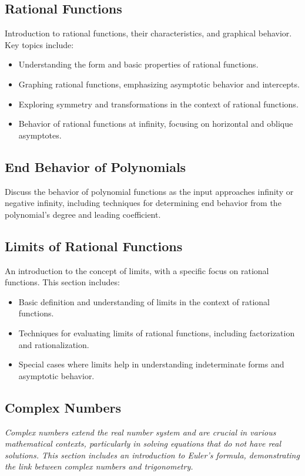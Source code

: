 \documentclass[a4paper,12pt]{book}
\begin{document}
\subsection{Rational Functions}
\label{subsec:rational_functions}
Introduction to rational functions, their characteristics, and graphical behavior. Key topics include:


\begin{itemize}
    \item Understanding the form and basic properties of rational functions.
    \item Graphing rational functions, emphasizing asymptotic behavior and intercepts.
    \item Exploring symmetry and transformations in the context of rational functions.
    \item Behavior of rational functions at infinity, focusing on horizontal and oblique asymptotes.
\end{itemize}


\subsection{End Behavior of Polynomials}
\label{subsec:end_behavior_polynomials}
Discuss the behavior of polynomial functions as the input approaches infinity or negative infinity, including techniques for determining end behavior from the polynomial's degree and leading coefficient.


\subsection{Limits of Rational Functions}
\label{subsec:limits_rational_functions}
An introduction to the concept of limits, with a specific focus on rational functions. This section includes:


\begin{itemize}
    \item Basic definition and understanding of limits in the context of rational functions.
    \item Techniques for evaluating limits of rational functions, including factorization and rationalization.
    \item Special cases where limits help in understanding indeterminate forms and asymptotic behavior.
\end{itemize}


\subsection{Complex Numbers}
\label{subsec:complex_numbers}
\textit{Complex numbers extend the real number system and are crucial in various mathematical contexts, particularly in solving equations that do not have real solutions. This section includes an introduction to Euler's formula, demonstrating the link between complex numbers and trigonometry.}
\end{document}
